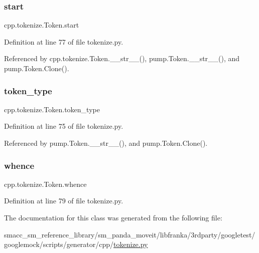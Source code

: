 \subsubsection{\texorpdfstring{start}{start}}
{\footnotesize\ttfamily cpp.\+tokenize.\+Token.\+start}



Definition at line 77 of file tokenize.\+py.



Referenced by cpp.\+tokenize.\+Token.\+\_\+\+\_\+str\+\_\+\+\_\+(), pump.\+Token.\+\_\+\+\_\+str\+\_\+\+\_\+(), and pump.\+Token.\+Clone().

\mbox{\label{classcpp_1_1tokenize_1_1Token_a60c6e5120f3947885f10788ceb69a660}} 
\subsubsection{\texorpdfstring{token\+\_\+type}{token\_type}}
{\footnotesize\ttfamily cpp.\+tokenize.\+Token.\+token\+\_\+type}



Definition at line 75 of file tokenize.\+py.



Referenced by pump.\+Token.\+\_\+\+\_\+str\+\_\+\+\_\+(), and pump.\+Token.\+Clone().

\mbox{\label{classcpp_1_1tokenize_1_1Token_a9d3a8011707ede6be85987d74f88848d}} 
\subsubsection{\texorpdfstring{whence}{whence}}
{\footnotesize\ttfamily cpp.\+tokenize.\+Token.\+whence}



Definition at line 79 of file tokenize.\+py.



The documentation for this class was generated from the following file\+:\begin{DoxyCompactItemize}
\item 
smacc\+\_\+sm\+\_\+reference\+\_\+library/sm\+\_\+panda\+\_\+moveit/libfranka/3rdparty/googletest/googlemock/scripts/generator/cpp/\hyperlink{tokenize_8py}{tokenize.\+py}\end{DoxyCompactItemize}
